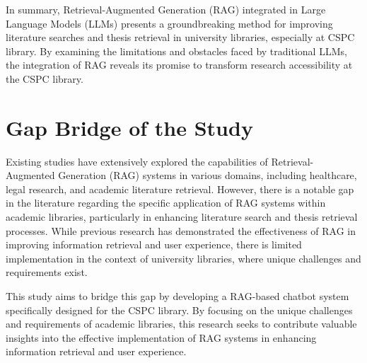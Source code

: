 \begin{refsection}
\hspace{0.4cm} In summary, Retrieval-Augmented Generation (RAG) integrated in Large Language Models (LLMs) presents a groundbreaking method for improving literature searches and thesis retrieval in university libraries, especially at CSPC library. By examining the limitations and obstacles faced by traditional LLMs, the integration of RAG reveals its promise to transform research accessibility at the CSPC library.

\section{Gap Bridge of the Study}


\hspace{0.4cm}Existing studies have extensively explored the capabilities of Retrieval-Augmented Generation (RAG) systems in various domains, including healthcare, legal research, and academic literature retrieval. However, there is a notable gap in the literature regarding the specific application of RAG systems within academic libraries, particularly in enhancing literature search and thesis retrieval processes. While previous research has demonstrated the effectiveness of RAG in improving information retrieval and user experience, there is limited implementation in the context of university libraries, where unique challenges and requirements exist.

\newpage
\hspace{0.4cm}This study aims to bridge this gap by developing a RAG-based chatbot system specifically designed for the CSPC library. By focusing on the unique challenges and requirements of academic libraries, this research seeks to contribute valuable insights into the effective implementation of RAG systems in enhancing information retrieval and user experience.


\clearpage

\printbibliography[heading=subbibintoc, title={\centering Notes}]
\end{refsection}
